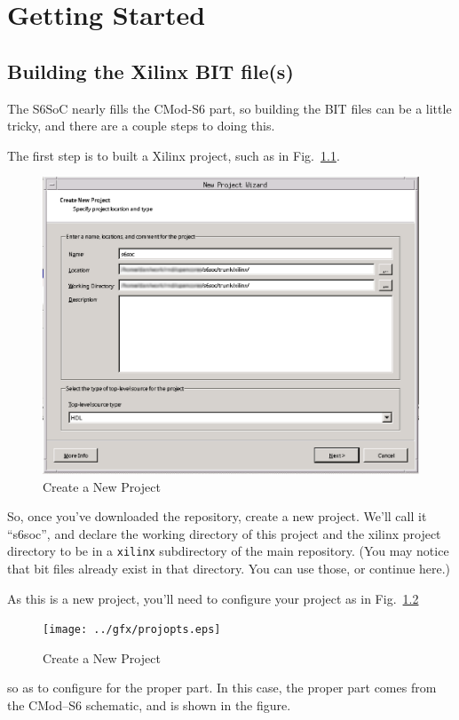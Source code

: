 \documentclass{gqtekspec}
\begin{document}
\chapter{Getting Started}
\section{Building the Xilinx BIT file(s)}
The S6SoC nearly fills the CMod-S6 part, so building the BIT files can be a
little tricky, and there are a couple steps to doing this.

The first step is to built a Xilinx project, such as in Fig.~\ref{fig:new-prj}.
\begin{figure}
\begin{center}
\includegraphics[width=6in]{../gfx/newprj.eps}
\caption{Create a New Project}\label{fig:new-prj}
\end{center}\end{figure}
So, once you've downloaded the
repository, create a new project.  We'll call it ``s6soc'', and declare
the working directory of this project and the xilinx project directory to
be in a {\tt xilinx} subdirectory of the main repository.  (You may notice
that bit files already exist in that directory.  You can use those, or
continue here.)

As this is a new project, you'll need to configure your project as in
Fig.~\ref{fig:projopts}
\begin{figure}
\begin{center}
\texttt{[image: ../gfx/projopts.eps]}
\caption{Create a New Project}\label{fig:projopts}
\end{center}\end{figure}
so as to configure for the proper part.  In this case, the proper part comes
from the CMod--S6 schematic, and is shown in the figure.
\end{document}
